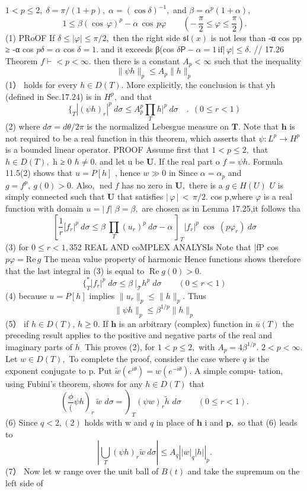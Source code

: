 $1<p\leq2,\;\delta=\pi/(1+p),\;\alpha=(\cos\delta)^{-1},$ and $\beta=\alpha^{p}(1+\alpha),$ $$ 1\leq\beta(\cos\,\varphi)^{p}-\alpha\,\cos\,p\varphi\qquad\left(-\,\frac{\pi}{2}\leq\varphi\leq\frac{\pi}{2}\right). $$ (1) PRoOF If $\delta\leq|\varphi|\leq\pi/2,$ then the right side $\mathfrak{s l}(x)$ is not less than -α cos pp ≥ -α cos $p\delta=\alpha$ cos $\delta=1.$ and it exceeds β(cos $\delta\mathsf{P}-\alpha=1\,\mathrm{if}\left|\,\varphi\right|\leq\delta.$ // 17.26 Theorem $f\vdash<p<\infty.$ then there is a constant $A_{p}<\infty$ such that the inequality $$ \|\psi h\|_{p}\leq A_{p}\|h\|_{p} $$ (1） holds for every $h\in D(T).$ More explicitly, the conclusion is that yh (defined in Sec.17.24) is in $H^{p},$ and that $$ \{_{T}|(\psi h)_{r}|^{p}\ d\sigma\leq A_{p}^{p}\prod_{T}h|^{p}\ d\sigma\quad.\ \ (0\leq r<1) $$ (2) where $d\sigma=d\theta/2\pi$ is the normalized Lebesgue measure on ${\boldsymbol{T}}.$ Note that $\boldsymbol{h}$ is not required to be a real function in this theorem, which asserts that $\psi\colon L^{p}\to H^{p}$ is a bounded linear operator. PROOF Assume first that $1<p\leq2,$ that $h\in D(T),$ h ≥ 0 $\hbar\neq0.$ and let u be ${\boldsymbol{U}}.$ If the real part o $f=\psi h.$ Formula 11.5(2) shows that $u=P[h]$ , hence $\scriptstyle w\gg0$ in Since $\alpha=\alpha_{p}$ and $g=f^{p},\ g(0)>0.$ Also, $\operatorname{ned}f$ has no zero in ${\boldsymbol{U}},$ there is a $g\in H(U)$ $U$ is simply connected such that ${\boldsymbol{U}}$ that satisfies $|\,\varphi\,|\,<\,\pi/2.$ cos p,where $\varphi$ is a real function with domain $u=|\,f|$ $\beta=\beta,$ are chosen as in Lemma 17.25,it follows tha $$ \left[\frac{1}{r}[f_{r}|^{p}\:d\sigma\leq\beta\:\prod_{T}^{}(u_{r})^{p}\:d\sigma-\alpha\:\right]_{T}^{}|f_{r}|^{p}\:\cos\:(p\varphi_{r})\:d\sigma $$ (3) for $0\leq r<1,$352 REAL AND coMPLEX ANALYSIs Note that |fP cos $p\varphi=\mathrm{Re}\,g$ The mean value property of harmonic Hence functions shows therefore that the last integral in (3) is equal to $\operatorname{Re}g(0)>0.$ $$ \{_{T}^{\ast}|f_{r}|^{p}\;d\sigma\leq\beta\ |_{\mathcal{T}}h^{p}\;d\sigma\qquad(0\leq r<1) $$ (4) because $u=P[h]$ implies $\|u_{r}\|_{p}\leq\|h\|_{p}.$ Thus $$ \|\psi h\|_{p}\leq\beta^{1/p}\|h\|_{p} $$ (5） if $h\in D(T),\,h\geq0.$ If ${\boldsymbol{h}}$ is an arbitrary (complex) function in $\scriptstyle{\bar{u}}(T)$ the preceding result applies to the positive and negative parts of the real and imaginary parts of $h_{\mathrm{.}}$ This proves (2), for $1<p\leq2,$ with $A_{p}=4\beta^{1/p}.$ $2<p<\infty.$ Let $w\in D(T),$ To complete the proof, consider the case where $\boldsymbol{\mathit{q}}$ is the exponent conjugate to p. Put $\tilde{w}(e^{i\theta})=w(e^{-i\theta}).$ A simple compu- tation, using Fubini's theorem, shows for any $h\in D(T)$ that $$ \left. (\frac\phi(\psi h)_{r}\,\tilde{w}\,\,d\sigma=\right)_{T}^{}(\psi w)_{r}\tilde{h}\,\,d\sigma\qquad(0\leq r<1). $$ (6) Since $q<2,(2)$ holds with w and $\boldsymbol{\mathit{q}}$ in place of ${\boldsymbol{h}}$ i and ${\boldsymbol{p}},$ so that (6) leads to $$ \left|\bigcup_{T}(\psi h)_{r}\tilde{w}\ d\sigma\right|\leq A_{q}\left|\left|w\right|_{q}\left|h\right|\right|_{p}. $$ (7） Now let w range over the unit ball of $\scriptstyle B(t)$ and take the supremum on the left side of 